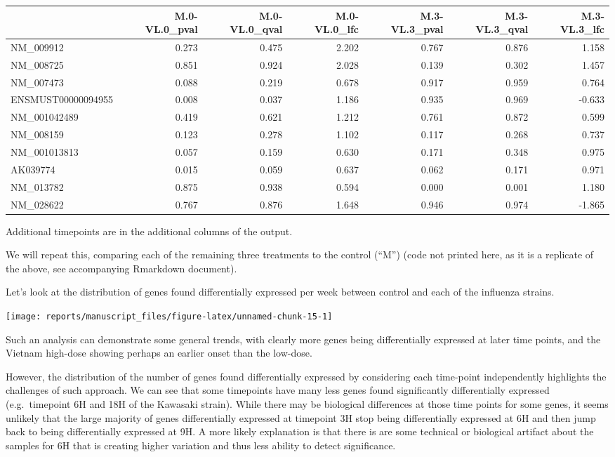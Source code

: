 \documentclass[9pt,a4paper,]{extarticle}
\begin{document}
\begin{tabular}{lrrrrrr}
\toprule
  & M.0-VL.0\_pval & M.0-VL.0\_qval & M.0-VL.0\_lfc & M.3-VL.3\_pval & M.3-VL.3\_qval & M.3-VL.3\_lfc\\
\midrule
NM\_009912 & 0.273 & 0.475 & 2.202 & 0.767 & 0.876 & 1.158\\
NM\_008725 & 0.851 & 0.924 & 2.028 & 0.139 & 0.302 & 1.457\\
NM\_007473 & 0.088 & 0.219 & 0.678 & 0.917 & 0.959 & 0.764\\
ENSMUST00000094955 & 0.008 & 0.037 & 1.186 & 0.935 & 0.969 & -0.633\\
NM\_001042489 & 0.419 & 0.621 & 1.212 & 0.761 & 0.872 & 0.599\\
\addlinespace
NM\_008159 & 0.123 & 0.278 & 1.102 & 0.117 & 0.268 & 0.737\\
NM\_001013813 & 0.057 & 0.159 & 0.630 & 0.171 & 0.348 & 0.975\\
AK039774 & 0.015 & 0.059 & 0.637 & 0.062 & 0.171 & 0.971\\
NM\_013782 & 0.875 & 0.938 & 0.594 & 0.000 & 0.001 & 1.180\\
NM\_028622 & 0.767 & 0.876 & 1.648 & 0.946 & 0.974 & -1.865\\
\bottomrule
\end{tabular}

Additional timepoints are in the additional columns of the output.

We will repeat this, comparing each of the remaining three treatments to the
control (``M'') (code not printed here, as it is a replicate of the above, see
accompanying Rmarkdown document).

Let's look at the distribution of genes found differentially expressed per
week between control and each of the influenza strains.

\begin{center}\texttt{[image: reports/manuscript\_files/figure-latex/unnamed-chunk-15-1]} \end{center}

Such an analysis can demonstrate some general trends, with clearly more genes
being differentially expressed at later time points, and the Vietnam high-dose
showing perhaps an earlier onset than the low-dose.

However, the distribution of the number of genes found differentially
expressed by considering each time-point independently highlights the
challenges of such approach. We can see that some timepoints have many less
genes found significantly differentially expressed (e.g.~timepoint 6H and 18H
of the Kawasaki strain). While there may be biological differences at those
time points for some genes, it seems unlikely that the large majority of genes
differentially expressed at timepoint 3H stop being differentially expressed
at 6H and then jump back to being differentially expressed at 9H. A more
likely explanation is that there is are some technical or biological artifact
about the samples for 6H that is creating higher variation and thus less
ability to detect significance.
\end{document}
